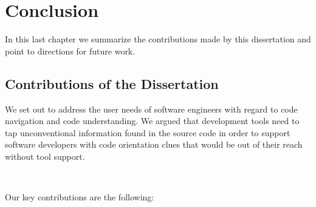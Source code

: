 \chapter{Conclusion}
\label{the conclusion}

In this last chapter we summarize the contributions made by this dissertation and point to directions for future work.

\section{Contributions of the Dissertation}

We set out to address the user needs of software engineers with regard to code navigation and code understanding. We argued that development tools need to tap unconventional information found in the source code in order to support software developers with code orientation clues that would be out of their reach without tool support. 

~

\noindent Our key contributions are the following:

